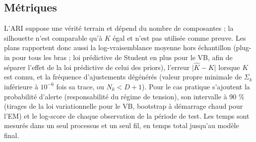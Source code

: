 \subsection{Métriques}\label{sec:metriques}
L'ARI suppose une vérité terrain et dépend du nombre de composantes ; la silhouette n'est comparable qu'à $K$ égal et n'est pas utilisée comme preuve. Les plans rapportent donc aussi la log-vraisemblance moyenne hors échantillon (plug-in pour tous les bras ; loi prédictive de Student en plus pour le VB, afin de séparer l'effet de la loi prédictive de celui des priors), l'erreur $\lvert \hat K - K \rvert$ lorsque $K$ est connu, et la fréquence d'ajustements dégénérés (valeur propre minimale de $\Sigma_k$ inférieure à $10^{-6}$ fois sa trace, ou $N_k < D+1$). Pour le cas pratique s'ajoutent la probabilité d'alerte (responsabilité du régime de tension), son intervalle à 90 \% (tirages de la loi variationnelle pour le VB, bootstrap à démarrage chaud pour l'EM) et le log-score de chaque observation de la période de test. Les temps sont mesurés dans un seul processus et un seul fil, en temps total jusqu'au modèle final.


